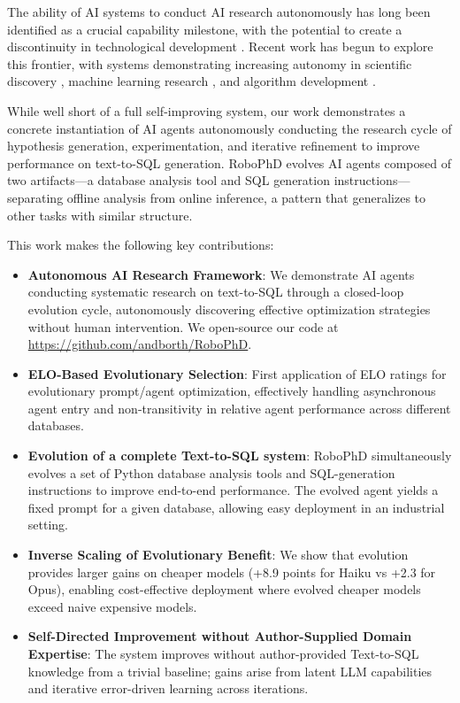 \documentclass{article}
\begin{document}
The ability of AI systems to conduct AI research autonomously has long been identified as a crucial capability milestone, with the potential to create a discontinuity in technological development \citep{good1965ultraintelligent, chalmers2010singularity}.
Recent work has begun to explore this frontier, with systems demonstrating increasing autonomy in scientific discovery \citep{romera2024mathematical}, machine learning research \citep{lu2024aiscientist}, and algorithm development \citep{fawzi2022discovering}.

While well short of a full self-improving system, our work demonstrates a concrete instantiation of AI agents autonomously conducting the research cycle of hypothesis generation, experimentation, and iterative refinement to improve performance on text-to-SQL generation. RoboPhD evolves AI agents composed of two artifacts---a database analysis tool and SQL generation instructions---separating offline analysis from online inference, a pattern that generalizes to other tasks with similar structure.

This work makes the following key contributions:
\begin{itemize}
    \item \textbf{Autonomous AI Research Framework}: We demonstrate AI agents conducting systematic research on text-to-SQL through a closed-loop evolution cycle, autonomously discovering effective optimization strategies without human intervention. We open-source our code at \url{https://github.com/andborth/RoboPhD}.
    \item \textbf{ELO-Based Evolutionary Selection}: First application of ELO ratings for evolutionary prompt/agent optimization, effectively handling asynchronous agent entry and non-transitivity in relative agent performance across different databases.
    \item \textbf{Evolution of a complete Text-to-SQL system}: RoboPhD simultaneously evolves a set of Python database analysis tools and SQL-generation instructions to improve end-to-end performance.  The evolved agent yields a fixed prompt for a given database, allowing easy deployment in an industrial setting.
    \item \textbf{Inverse Scaling of Evolutionary Benefit}: We show that evolution provides larger gains on cheaper models (+8.9 points for Haiku vs +2.3 for Opus), enabling cost-effective deployment where evolved cheaper models exceed naive expensive models.
    \item \textbf{Self-Directed Improvement without Author-Supplied Domain Expertise}: The system improves without author-provided Text-to-SQL knowledge from a trivial baseline; gains arise from latent LLM capabilities and iterative error-driven learning across iterations.
\end{itemize}
\end{document}
